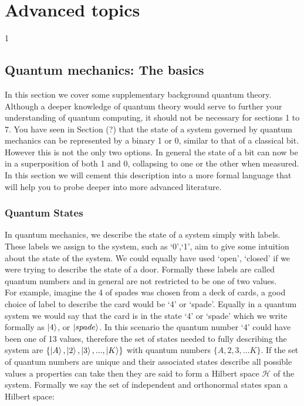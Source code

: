 \section{Advanced topics}\label{Advanced topics}
1
\subsection{Quantum mechanics: The basics}

In this section we cover some supplementary background quantum theory. Although a deeper knowledge of quantum theory would serve to further your understanding of quantum computing, it should not be necessary for sections 1 to 7. You have seen in Section (?) that the state of a system governed by quantum mechanics can be represented by a binary 1 or 0, similar to that of a classical bit. However this is not the only two options. In general the state of a bit can now be in a superposition of both 1 and 0, collapsing to one or the other when measured. In this section we will cement this description into a more formal language that will help you to probe deeper into more advanced literature.

\subsubsection{Quantum States}

In quantum mechanics, we describe the state of a system simply with labels. These labels we assign to the system, such as {`0',`1'}, aim to give some intuition about the state of the system. We could equally have used {`open', `closed'} if we were trying to describe the state of a door. Formally these labels are called quantum numbers and in general are not restricted to be one of two values.\\

For example, imagine the 4 of spades was chosen from a deck of cards, a good choice of label to describe the card would be `4' or `spade'. Equally in a quantum system we would say that the card is in the state `4' or `spade' which we write formally as $\left\vert{4}\right\rangle$, or $\left\vert{spade}\right\rangle$. In this scenario the quantum number `4' could have been one of 13 values, therefore the set of states needed to fully describing the system are $\{\left\vert{A}\right\rangle, \left\vert{2}\right\rangle, \left\vert{3}\right\rangle,...,\left\vert{K}\right\rangle\}$ with quantum numbers $\{A,2,3,...K\}$. If the set of quantum numbers are unique and their associated states describe all possible values a properties can take then they are said to form a Hilbert space $\mathcal{H}$ of the system. Formally we say the set of independent and orthonormal states span a Hilbert space:

